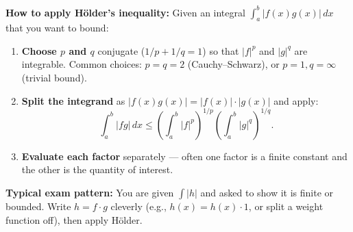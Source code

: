 \documentclass[../master/master.tex]{subfiles}
\begin{document}
\begin{notebox}
\textbf{How to apply H\"{o}lder's inequality:} Given an integral $\int_a^b |f(x) g(x)|\, dx$ that you want to bound:
\begin{enumerate}
    \item \textbf{Choose $p$ and $q$} conjugate ($1/p + 1/q = 1$) so that $|f|^p$ and $|g|^q$ are integrable. Common choices: $p = q = 2$ (Cauchy--Schwarz), or $p = 1, q = \infty$ (trivial bound).
    \item \textbf{Split the integrand} as $|f(x) g(x)| = |f(x)| \cdot |g(x)|$ and apply:
    \[
        \int_a^b |f g|\, dx \leq \left(\int_a^b |f|^p\right)^{1/p} \left(\int_a^b |g|^q\right)^{1/q}.
    \]
    \item \textbf{Evaluate each factor} separately --- often one factor is a finite constant and the other is the quantity of interest.
\end{enumerate}
\textbf{Typical exam pattern:} You are given $\int |h|$ and asked to show it is finite or bounded. Write $h = f \cdot g$ cleverly (e.g., $h(x) = h(x) \cdot 1$, or split a weight function off), then apply H\"{o}lder.
\end{notebox}
\end{document}
